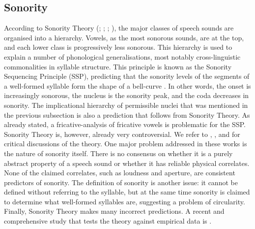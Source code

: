 \documentclass[output=paper,colorlinks,citecolor=brown,chinesefont]{langscibook}
\begin{document}
\subsection{Sonority} \label{section:sonority}
According to Sonority Theory (\cite{Clements_1990}; \cite{Zec_1995}; \cite{Parker_2008}; \cite{Yin_et_al_2023}), the major classes of speech sounds are organised into a hierarchy. Vowels, as the most sonorous sounds, are at the top, and each lower class is progressively less sonorous. This hierarchy is used to explain a number of phonological generalisations, most notably cross-linguistic commonalities in syllable structure. This principle is known as the Sonority Sequencing Principle (SSP), predicting that the sonority levels of the segments of a well-formed syllable form the shape of a bell-curve \citep{Clements_1990}. In other words, the onset is increasingly sonorous, the nucleus is the sonority peak, and the coda decreases in sonority. The implicational hierarchy of permissible nuclei that was mentioned in the previous subsection is also a prediction that follows from Sonority Theory. As already stated, a fricative-analysis of fricative vowels is problematic for the SSP. Sonority Theory is, however, already very controversial. We refer to \citet{Ohala&Kawasaki-Fukumori_1997}, \citet{Harris_2006}, and \citet{Parker_2012} for critical discussions of the theory. One major problem addressed in these works is the nature of sonority itself. There is no consensus on whether it is a purely abstract property of a speech sound or whether it has reliable physical correlates. None of the claimed correlates, such as loudness and aperture, are consistent predictors of sonority. The definition of sonority is another issue: it cannot be defined without referring to the syllable, but at the same time sonority is claimed to determine what well-formed syllables are, suggesting a problem of circularity. Finally, Sonority Theory makes many incorrect predictions. A recent and comprehensive study that tests the theory against empirical data is \citet{Yin_et_al_2023}.
\end{document}
